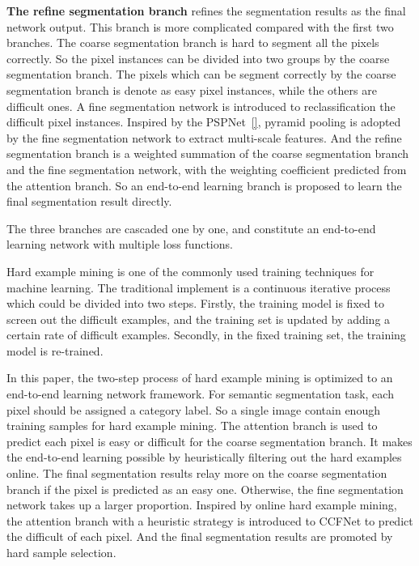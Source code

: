 \documentclass[10.5pt,compsoc]{TsT}
\theoremstyle{mystyle}
\begin{document}
{\textbf{The refine segmentation branch} refines the segmentation results as the final network output.
This branch is more complicated compared with the first two branches.
The coarse segmentation branch is hard to segment all the pixels correctly.
So the pixel instances can be divided into two groups by the coarse segmentation branch.
The pixels which can be segment correctly by the coarse segmentation branch is denote as easy pixel instances, while the others are difficult ones.
A fine segmentation network is introduced to reclassification the difficult pixel instances.
Inspired by the PSPNet~\ref{}, pyramid pooling is adopted by the fine segmentation network to extract multi-scale features.
And the refine segmentation branch is a weighted summation of the coarse segmentation branch and the fine segmentation network, with the weighting coefficient predicted from the attention branch.
So an end-to-end learning branch is proposed to learn the final segmentation result directly.

The three branches are cascaded one by one, and constitute an end-to-end learning network with multiple loss functions.



Hard example mining is one of the commonly used training techniques for machine learning.
The traditional implement is a continuous iterative process which could be divided into two steps.
Firstly, the training model is fixed to screen out the difficult examples, and the training set is updated by adding a certain rate of difficult examples.
Secondly, in the fixed training set, the training model is re-trained.

In this paper, the two-step process of hard example mining is optimized to an end-to-end learning network framework.
For semantic segmentation task, each pixel should be assigned a category label.
So a single image contain enough training samples for hard example mining.
The attention branch is used to predict each pixel is easy or difficult for the coarse segmentation branch.
It makes the end-to-end learning possible by heuristically filtering out the hard examples online.
The final segmentation results relay more on the coarse segmentation branch if the pixel is predicted as an easy one.
Otherwise, the fine segmentation network takes up a larger proportion.
Inspired by online hard example mining, the attention branch with a heuristic strategy is introduced to CCFNet to predict the difficult of each pixel.
And the final segmentation results are promoted by hard sample selection.


}
\end{document}
